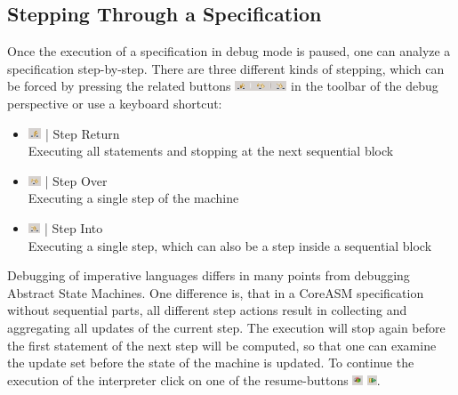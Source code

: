 \documentclass[10pt,oneside,a4paper]{article}
\begin{document}
\subsection{Stepping Through a Specification}
Once the execution of a specification in debug mode is paused, one can analyze a specification step-by-step. There are three different kinds of stepping, which can be forced by pressing the related buttons \includegraphics[height=0.8em]{images/step-buttons.png} in the toolbar of the debug perspective or use a keyboard shortcut:
\begin{itemize}
	\item	\includegraphics[height=0.8em]{images/step-return.png} |  Step Return\\
			Executing all statements and stopping at the next sequential block
	\item	\includegraphics[height=0.8em]{images/step-over.png} |  Step Over\\
			Executing a single step of the machine
	\item 	\includegraphics[height=0.8em]{images/step-in.png} |  Step Into\\
			Executing a single step, which can also be a step inside a sequential block
\end{itemize}
Debugging of imperative languages differs in many points from debugging Abstract State Machines. One difference is, that in a CoreASM specification without sequential parts, all different step actions result in collecting and aggregating all updates of the current step. The execution will stop again before the first statement of the next step will be computed, so that one can examine the update set before the state of the machine is updated.
To continue the execution of the interpreter click on one of the resume-buttons \includegraphics[height=0.8em]{images/resume-button.png} \includegraphics[height=0.8em]{images/resume-button1.png}.
\end{document}
